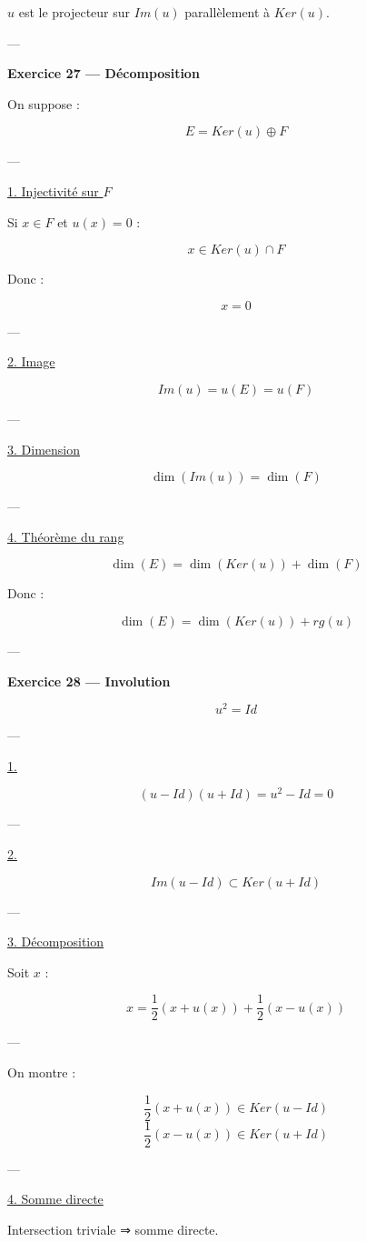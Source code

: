 \documentclass[11pt,a4paper]{article}
\begin{document}
$u$ est le projecteur sur $Im(u)$ parallèlement à $Ker(u)$.

---

\textbf{Exercice 27 — Décomposition}

On suppose :

\[
E = Ker(u) \oplus F
\]

---

\underline{1. Injectivité sur $F$}

Si $x \in F$ et $u(x)=0$ :

\[
x \in Ker(u) \cap F
\]

Donc :

\[
x=0
\]

---

\underline{2. Image}

\[
Im(u)=u(E)=u(F)
\]

---

\underline{3. Dimension}

\[
\dim(Im(u))=\dim(F)
\]

---

\underline{4. Théorème du rang}

\[
\dim(E)=\dim(Ker(u))+\dim(F)
\]

Donc :

\[
\boxed{\dim(E)=\dim(Ker(u))+rg(u)}
\]

---

\textbf{Exercice 28 — Involution}

\[
u^2=Id
\]

---

\underline{1.}

\[
(u-Id)(u+Id)=u^2-Id=0
\]

---

\underline{2.}

\[
Im(u-Id) \subset Ker(u+Id)
\]

---

\underline{3. Décomposition}

Soit $x$ :

\[
x = \frac{1}{2}(x+u(x)) + \frac{1}{2}(x-u(x))
\]

---

On montre :

\[
\frac{1}{2}(x+u(x)) \in Ker(u-Id)
\]
\[
\frac{1}{2}(x-u(x)) \in Ker(u+Id)
\]

---

\underline{4. Somme directe}

Intersection triviale ⇒ somme directe.
\end{document}
